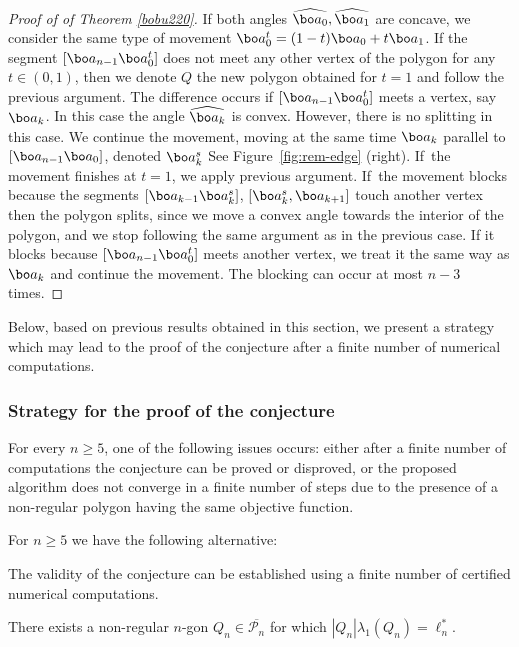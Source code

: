 \begin{proof}[Proof of of Theorem \ref{bobu220}]
If both angles $\widehat{\bo a_0}, \widehat{\bo a_1}$ are concave, we consider the same type of movement $\bo a_0^t= (1-t) \bo a_0+t\bo a_1$. If the segment $[\bo a_{n-1}\bo a_0^t]$ does not meet any other vertex of the polygon for any $t\in(0,1)$, then we denote $Q$ the new polygon obtained for $t=1$ and follow the previous argument. The difference occurs if $[\bo a_{n-1}\bo a_0^t]$ meets a vertex, say $\bo a_k$. In this case the angle $\widehat{\bo a_k}$ is convex. However, there is no splitting in this case. We continue the movement, moving at the same time $\bo a_k$ {parallel to $[\bo a_{n-1}\bo a_0]$, denoted $\bo a_k^s$ See Figure~\ref{fig:rem-edge} (right)}.
If~the movement finishes at $t=1$, we apply previous argument. If~the movement blocks because the {segments $[\bo a_{k-1}\bo a_k^s]$, $[\bo a_k^s, \bo a_{k+1}]$ touch another vertex} then the polygon {splits, since we move a convex angle towards the interior of the polygon, and we stop following the same argument as in the previous case}. If it blocks because $[\bo a_{n-1}\bo a_0^t]$ meets another vertex, we treat it the same way as $\bo a_k$ and continue the movement. The blocking can occur at most $n-3$ times.
\end{proof}

Below, based on previous results obtained in this section, we present a strategy which may lead to the proof of the conjecture after a finite number of numerical computations.

\subsubsection*{Strategy for the proof of the conjecture}
For every $n \ge 5$, one of the following issues occurs: either after a finite number of computations the conjecture can be proved or disproved, or the proposed algorithm does not converge in a finite number of steps due to the presence of a non-regular polygon having the same objective function.

\begin{thm}\label{thm:numerical-proof}
For $n \geq 5$ we have the following alternative:
\begin{enumeratea}
\item\label{thm:numerical-proofa}
The validity of the conjecture can be established using a finite number of certified numerical computations.

\item\label{thm:numerical-proofb}
There exists a non-regular $n$-gon $Q_n \in \overline{\mathcal P_n}$ for which $|Q_n|\lambda_1(Q_n) = \ell_n^*$.
\end{enumeratea}
\end{thm}

